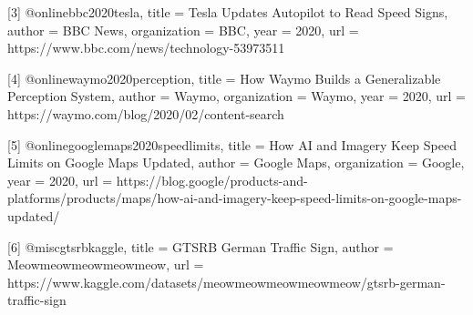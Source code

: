 \documentclass[final]{article}
\begin{document}
[3] @online{bbc2020tesla,
  title        = {Tesla Updates Autopilot to Read Speed Signs},
  author       = {{BBC News}},
  organization = {BBC},
  year         = {2020},
  url          = {https://www.bbc.com/news/technology-53973511}
}

[4] @online{waymo2020perception,
  title        = {How Waymo Builds a Generalizable Perception System},
  author       = {{Waymo}},
  organization = {Waymo},
  year         = {2020},
  url          = {https://waymo.com/blog/2020/02/content-search}
}

[5] @online{googlemaps2020speedlimits,
  title        = {How AI and Imagery Keep Speed Limits on Google Maps Updated},
  author       = {{Google Maps}},
  organization = {Google},
  year         = {2020},
  url          = {https://blog.google/products-and-platforms/products/maps/how-ai-and-imagery-keep-speed-limits-on-google-maps-updated/}
}

[6] @misc{gtsrbkaggle,
  title        = {GTSRB German Traffic Sign},
  author       = {Meowmeowmeowmeowmeow},
  url = {https://www.kaggle.com/datasets/meowmeowmeowmeowmeow/gtsrb-german-traffic-sign}
}
\end{document}
